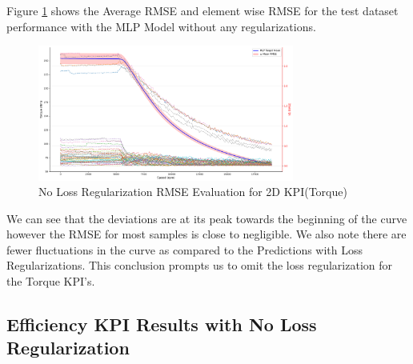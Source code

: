\documentclass{report} %
\begin{document}
Figure \ref{fig:No Loss Regularization RMSE Evaluation for 2D KPI(Torque)} shows the Average \ac{RMSE} and element wise \ac{RMSE} for the test dataset performance with the MLP Model without any regularizations.\\

\begin{figure}[H]
    \centering
    \includegraphics[width=0.75\textwidth]{./ReportImages/RMSE_MLP_no_lossreg_y1.png} 
    \caption{No Loss Regularization \ac{RMSE} Evaluation for 2D KPI(Torque)} 
    \label{fig:No Loss Regularization RMSE Evaluation for 2D KPI(Torque)}
\end{figure}

We can see that the deviations are at its peak towards the beginning of the curve however the \ac{RMSE} for most samples is close to negligible.
We also note there are fewer fluctuations in the curve as compared to the Predictions with Loss Regularizations.
This conclusion prompts us to omit the loss regularization for the Torque \ac{KPI}'s.\\

\subsection{Efficiency \ac{KPI} Results with No Loss Regularization}\label{subsec:3D Efficiency Results with No Loss Regularization}
\end{document}
